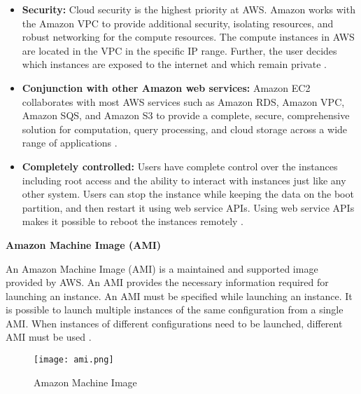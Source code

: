 \begin{itemize}
    \item \textbf{Security:} Cloud security is the highest priority at AWS. Amazon works with the Amazon VPC to provide additional security, isolating resources, and robust networking for the compute resources.
    The compute instances in AWS are located in the VPC in the specific IP range.
    Further, the user decides which instances are exposed to the internet and which remain private \cite{29}.
\end{itemize}

\begin{itemize}
    \item \textbf{Conjunction with other Amazon web
    services:} Amazon EC2 collaborates with most AWS
    services such as Amazon RDS, Amazon VPC, Amazon SQS, and Amazon S3 to provide a complete, secure, comprehensive solution for
    computation, query processing, and cloud storage across a wide range of applications \cite{29}.
\end{itemize}

\begin{itemize}
    \item \textbf{Completely controlled:} Users have complete control over the instances including root access and the ability to interact with instances just like any other system. Users can stop the instance while keeping the data on the boot partition, and then restart it using web service APIs. Using web service APIs makes it possible to reboot the instances remotely \cite{29}.
\end{itemize}

\textbf{Amazon Machine Image (AMI)}

\par An Amazon Machine Image (AMI) is a maintained and supported image provided by AWS. An AMI provides the necessary information required for launching an instance. An AMI must be specified while launching an instance. It is possible to launch multiple instances of the same configuration from a single AMI. When instances of different configurations need to be launched, different AMI must be used \cite{30}.

\begin{figure}
    \centering
    \texttt{[image: ami.png]}
    \caption{Amazon Machine Image}
    \label{fig:ami}
\end{figure}

